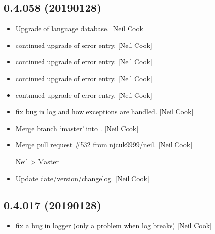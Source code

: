 \documentclass[a4paper,10pt,english]{report}
\begin{document}
\subsection{0.4.058 (2019\sphinxhyphen{}01\sphinxhyphen{}28)}
\label{\detokenize{misc/changelog:id223}}\begin{itemize}
\item {} 
Upgrade of language database. {[}Neil Cook{]}

\item {} 
 \sphinxhyphen{} continued upgrade of error entry. {[}Neil Cook{]}

\item {} 
 \sphinxhyphen{} continued upgrade of error entry. {[}Neil Cook{]}

\item {} 
 \sphinxhyphen{} continued upgrade of error entry. {[}Neil Cook{]}

\item {} 
 \sphinxhyphen{} continued upgrade of error entry. {[}Neil Cook{]}

\item {} 
 \sphinxhyphen{} fix bug in log and how exceptions are handled. {[}Neil
Cook{]}

\item {} 
Merge branch ‘master’ into . {[}Neil Cook{]}

\item {} 
Merge pull request \#532 from njcuk9999/neil. {[}Neil Cook{]}

Neil \sphinxhyphen{}\textgreater{} Master

\item {} 
Update date/version/changelog. {[}Neil Cook{]}

\end{itemize}


\subsection{0.4.017 (2019\sphinxhyphen{}01\sphinxhyphen{}28)}
\label{\detokenize{misc/changelog:id224}}\begin{itemize}
\item {} 
 \sphinxhyphen{} fix a bug in logger (only a problem when log breaks)
{[}Neil Cook{]}

\end{itemize}
\end{document}
